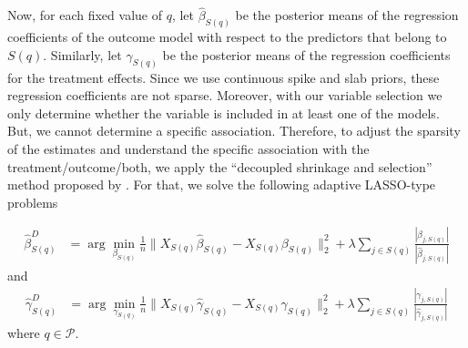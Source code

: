 \documentclass[preprint,12pt]{elsarticle}
\begin{document}
Now, for each fixed value of $q$, let $\hat{\beta}_{S(q)}$ be the posterior means 
of the regression coefficients of the outcome model with respect to
the predictors that belong to $S(q)$. Similarly,
let $\hat{\gamma}_{S(q)}$ be the posterior means of the regression
coefficients for the treatment effects. Since we use continuous 
spike and slab priors, these regression coefficients are not sparse.
Moreover, with our variable selection we only determine whether the variable 
is included in at least one of the models. But, we cannot determine a specific 
association. Therefore, to adjust the sparsity of the estimates and understand
the specific association with the treatment/outcome/both, we apply the 
``decoupled shrinkage and selection'' method proposed by \cite{hahn2015}. 
For that, we solve the following adaptive LASSO-type \cite{Zou2006}
problems

\begin{align}
	\hat{\beta}^D_{S(q)} &= 
	\arg\min_{\beta_{S(q)}} \frac{1}{n}\|X_{S(q)}\hat{\beta}_{S(q)}
	- X_{S(q)} \beta_{S(q)}\|_2^2 + \lambda\sum_{j\in S(q)} 
	\frac{|\beta_{j,S(q)}|}{|\hat{\beta}_{j,S(q)}|}
\end{align}
and
\begin{align}
	\hat{\gamma}^D_{S(q)} &= 
	\arg\min_{\gamma_{S(q)}} \frac{1}{n}\|X_{S(q)}\hat{\gamma}_{S(q)}
	- X_{S(q)} \gamma_{S(q)}\|_2^2 + \lambda\sum_{j\in S(q)} 
	\frac{|\gamma_{j,S(q)}|}{|\hat{\gamma}_{j,S(q)}|}
\end{align}
where $q\in \mathcal{P}$.

\end{document}
